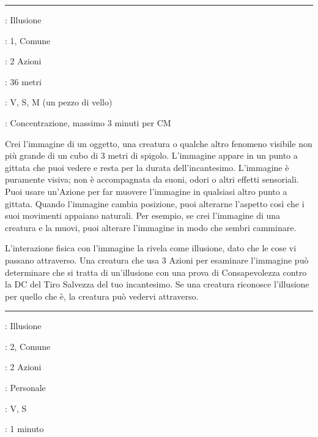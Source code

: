\begin{multicols}{2}
\smallskip\noindent\rule{\linewidth}{2pt} \hypertarget{Immagine Silenziosa}{}\smallskip{}
\noindent
\begin{description}[noitemsep, topsep=0pt, parsep=0pt, partopsep=0pt, leftmargin=0cm, labelwidth=2.8cm]
	\item[\textbf{Lista di Magia}]: Illusione
	\item[\textbf{Livello}]: 1, Comune
	\item[\textbf{T. di Lancio}]: 2 Azioni
	\item[\textbf{Gittata}]: 36 metri
	\item[\textbf{Componenti}]: V, S, M (un pezzo di vello)
	\item[\textbf{Durata}]: Concentrazione, massimo 3 minuti per CM
\end{description}

Crei l'immagine di un oggetto, una creatura o qualche altro fenomeno visibile non più grande di un cubo di 3 metri di spigolo. L'immagine appare in un punto a gittata che puoi vedere e resta per la durata dell'incantesimo. L'immagine è puramente visiva; non è accompagnata da suoni, odori o altri effetti sensoriali. Puoi usare un'Azione per far muovere l'immagine in qualsiasi altro punto a gittata. Quando l'immagine cambia posizione, puoi alterarne l'aspetto così che i suoi movimenti appaiano naturali. Per esempio, se crei l'immagine di una creatura e la muovi, puoi alterare l'immagine in modo che sembri camminare.

L'interazione fisica con l'immagine la rivela come illusione, dato che le cose vi passano attraverso. Una creatura che usa 3 Azioni per esaminare l'immagine può determinare che si tratta di un'illusione con una prova di Consapevolezza contro la DC del Tiro Salvezza del tuo incantesimo. Se una creatura riconosce l'illusione per quello che è, la creatura può vedervi attraverso.

\smallskip\noindent\rule{\linewidth}{2pt} \hypertarget{Immagine Speculare}{}\smallskip{}
\noindent
\begin{description}[noitemsep, topsep=0pt, parsep=0pt, partopsep=0pt, leftmargin=0cm, labelwidth=2.8cm]
	\item[\textbf{Lista di Magia}]: Illusione
	\item[\textbf{Livello}]: 2, Comune
	\item[\textbf{T. di Lancio}]: 2 Azioni
	\item[\textbf{Gittata}]: Personale
	\item[\textbf{Componenti}]: V, S
	\item[\textbf{Durata}]: 1 minuto
\end{description}


\end{multicols}
